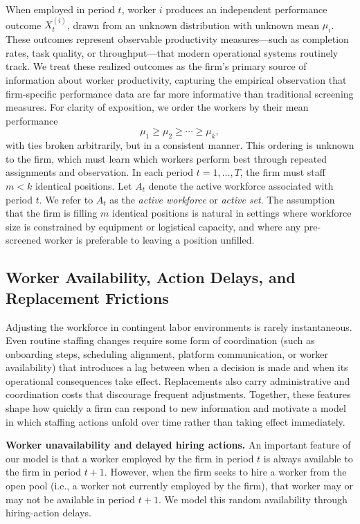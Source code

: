 \documentclass[opre,blindrev]{informs3}
\begin{document}
When employed in period $t$, worker \(i\) produces an independent performance outcome \(X_t^{(i)}\), drawn from an unknown distribution with unknown mean \(\mu_i\). These outcomes represent observable productivity measures---such as completion rates, task quality, or throughput---that modern operational systems routinely track. We treat these realized outcomes as the firm's primary source of information about worker productivity, capturing the empirical observation that firm-specific performance data are far more informative than traditional screening measures. For clarity of exposition, we order the workers by their mean performance 
\[
    \mu_1 \geq \mu_2 \geq \cdots \geq \mu_k,
\]
with ties broken arbitrarily, but in a consistent manner. This ordering is unknown to the firm, which must learn which workers perform best through repeated assignments and observation. In each period \(t = 1, \dots, T\), the firm must staff \(m < k\) identical positions. Let \(A_t\) denote the active workforce associated with period \(t\). We refer to \(A_t\) as the \emph{active workforce} or \emph{active set}. The assumption that the firm is filling \(m\) identical positions is natural in settings where workforce size is constrained by equipment or logistical capacity, and where any pre-screened worker is preferable to leaving a position unfilled.


\vspace{-.1in}
\subsection{Worker Availability, Action Delays, and Replacement Frictions}
Adjusting the workforce in contingent labor environments is rarely instantaneous. Even routine staffing changes require some form of coordination (such as onboarding steps, scheduling alignment, platform communication, or worker availability) that introduces a lag between when a decision is made and when its operational consequences take effect. Replacements also carry administrative and coordination costs that discourage frequent adjustments. Together, these features shape how quickly a firm can respond to new information and motivate a model in which staffing actions unfold over time rather than taking effect immediately.

{\bf Worker unavailability and delayed hiring actions.}
An important feature of our model is that a worker employed by the firm in period \(t\) is always available to the firm in period \(t+1\). However, when the firm seeks to hire a worker from the open pool (i.e., a worker not currently employed by the firm), that worker may or may not be available in period \(t+1\). We model this random availability through hiring-action delays.  
\end{document}
